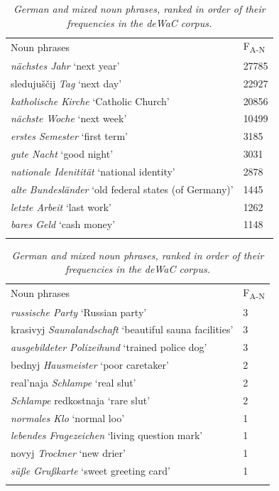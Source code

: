 \begin{table}
		{\begin{tabularx}{\textwidth}{XR{1.4cm}}
		    \midrule
			\addlinespace[2mm]
			Noun phrases	& F\textsubscript{A-N} \\ \addlinespace[2mm] \midrule
			\addlinespace[2mm]
			\textit{nächstes Jahr} `next year'	&27785\\
			sledujuščij \textit{Tag} `next day'	&22927\\
			\textit{katholische Kirche} `Catholic Church'	&20856\\
			\textit{nächste Woche}	`next week'	&10499\\
			\textit{erstes Semester} `first term'	&3185\\
			\textit{gute Nacht} `good night'	&3031\\
			\textit{nationale Idenitität} `national identity'	&2878\\
			\textit{alte Bundesländer} `old federal states (of Germany)'	&1445\\
			\textit{letzte Arbeit} `last work'	&1262\\
			\textit{bares Geld} `cash money'	&1148\\
			\addlinespace[2mm]
			\midrule 
		\end{tabularx}}
\caption{\textit{German and mixed noun phrases, ranked in order of their frequencies in the deWaC corpus.}} \label{tab:4:7}
\end{table}

\begin{table}
		{\begin{tabularx}{\textwidth}{XR{1.4cm}}
		\midrule
			\addlinespace[2mm]
			Noun phrases	& F\textsubscript{A-N} \\ \addlinespace[2mm] \midrule
			\addlinespace[2mm]
			\textit{russische Party} `Russian party'		&3\\
			krasivyj \textit{Saunalandschaft} `beautiful sauna facilities'	&3\\
			\textit{ausgebildeter Polizeihund} `trained police dog'	&3\\
			bednyj \textit{Hausmeister} `poor caretaker'		&2\\
			real'naja \textit{Schlampe} `real slut'	&2\\
			\textit{Schlampe} redkostnaja `rare slut'		&2\\
			\textit{normales Klo} `normal loo'	&1\\
			\textit{lebendes Fragezeichen} `living question mark'	&1\\
			novyj \textit{Trockner} `new drier'	&1\\
			\textit{süße Grußkarte} `sweet greeting card'	&1\\
			\addlinespace[2mm]
			\midrule 
		\end{tabularx}}
\caption{\textit{German and mixed noun phrases, ranked in order of their frequencies in the deWaC corpus.}} \label{tab:4:8}
\end{table}

